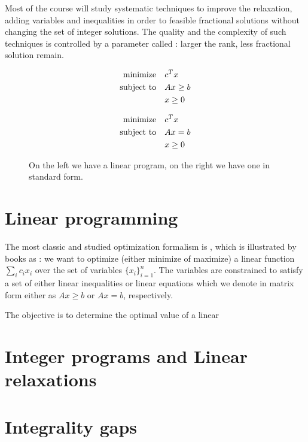 \documentclass[a4paper,twoside,justified]{tufte-handout}
\begin{document}
Most of the course will study systematic techniques to improve the
relaxation, adding variables and inequalities in order to
 feasible fractional solutions without changing
the set of integer solutions. The quality and the complexity of such
techniques is controlled by a parameter called :
larger the rank, less fractional solution remain.

\begin{figure}

\begin{minipage}{0.45\textwidth}
\begin{alignat*}{2}
  \text{minimize}\hspace{1em}& c^{T}x \\
  \text{subject to}\hspace{1em}& Ax \geq b\\
  & x \geq 0
\end{alignat*}
\end{minipage}
\vrule
\begin{minipage}{0.45\textwidth}
\begin{alignat*}{2}
  \text{minimize}\hspace{1em}& c^{T}x \\
  \text{subject to}\hspace{1em}& Ax = b\\
  & x \geq 0
\end{alignat*}
\end{minipage}
\caption{On the left we have a linear program, on the right we have
  one in standard form.}
\end{figure}

\section{Linear programming}

The most classic and studied optimization formalism is
, which is illustrated by books as
\cite{matousek2007understanding}: we want to optimize (either minimize
of maximize) a linear function $ \sum_{i} c_{i}x_{i} $ over the set of
variables $ \{x_{i}\}^{n}_{i=1} $. The variables are constrained to
satisfy a set of either linear inequalities or linear equations which
we denote in matrix form either as $ Ax \geq b $ or $ Ax = b$,
respectively.

The objective is to determine the
optimal value of a linear 

\section{Integer programs and Linear relaxations}


\section{Integrality gaps}
\end{document}
